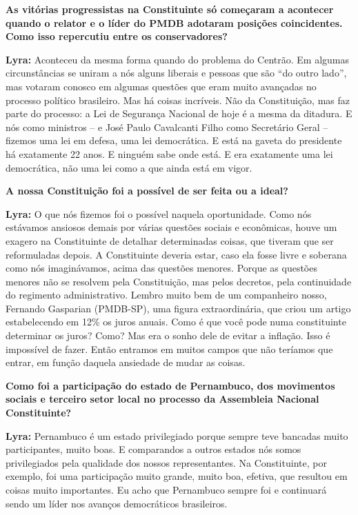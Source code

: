\textbf{As vitórias progressistas na Constituinte só começaram a
acontecer quando o relator e o líder do PMDB adotaram posições
coincidentes. Como isso repercutiu entre os conservadores?}

\textbf{Lyra:} Aconteceu da mesma forma quando do problema do Centrão.
Em algumas circunstâncias se uniram a nós alguns liberais e pessoas que
são ``do outro lado'', mas votaram conosco em algumas questões que eram
muito avançadas no processo político brasileiro. Mas há coisas
incríveis. Não da Constituição, mas faz parte do processo: a Lei de
Segurança Nacional de hoje é a mesma da ditadura. E nós como ministros
-- e José Paulo Cavalcanti Filho como Secretário Geral -- fizemos uma
lei em defesa, uma lei democrática. E está na gaveta do presidente há
exatamente 22 anos. E ninguém sabe onde está. E era exatamente uma lei
democrática, não uma lei como a que ainda está em vigor.

\textbf{A nossa Constituição foi a possível de ser feita ou a ideal?}

\textbf{Lyra:} O que nós fizemos foi o possível naquela oportunidade.
Como nós estávamos ansiosos demais por várias questões sociais e
econômicas, houve um exagero na Constituinte de detalhar determinadas
coisas, que tiveram que ser reformuladas depois. A Constituinte deveria
estar, caso ela fosse livre e soberana como nós imaginávamos, acima das
questões menores. Porque as questões menores não se resolvem pela
Constituição, mas pelos decretos, pela continuidade do regimento
administrativo. Lembro muito bem de um companheiro nosso, Fernando
Gasparian (PMDB-SP), uma figura extraordinária, que criou um artigo
estabelecendo em 12\% os juros anuais. Como é que você pode numa
constituinte determinar os juros? Como? Mas era o sonho dele de evitar a
inflação. Isso é impossível de fazer. Então entramos em muitos campos
que não teríamos que entrar, em função daquela ansiedade de mudar as
coisas.

\textbf{Como foi a participação do estado de Pernambuco, dos movimentos
sociais e terceiro setor local no processo da Assembleia Nacional
Constituinte?}

\textbf{Lyra:} Pernambuco é um estado privilegiado porque sempre teve
bancadas muito participantes, muito boas. E comparandos a outros estados
nós somos privilegiados pela qualidade dos nossos representantes. Na
Constituinte, por exemplo, foi uma participação muito grande, muito boa,
efetiva, que resultou em coisas muito importantes. Eu acho que
Pernambuco sempre foi e continuará sendo um líder nos avanços
democráticos brasileiros.

